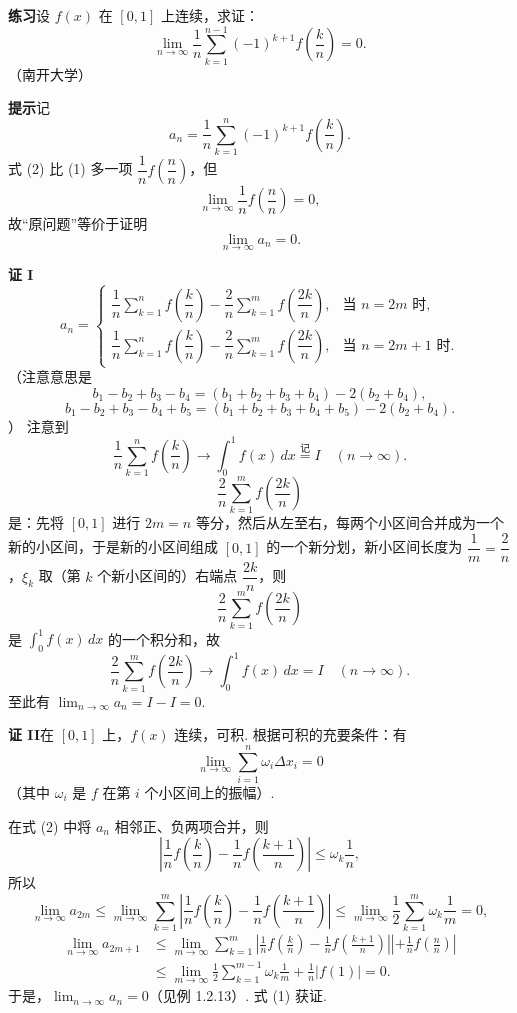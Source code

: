 \documentclass[UTF8, 12pt, fontset=fandol, oneside]{ctexart}
\begin{document}
\noindent\textbf{练习}\quad 设 $f(x)$ 在 $[0,1]$ 上连续，求证：
\[
\lim_{n\to\infty}\frac1n\sum_{k=1}^{n-1}(-1)^{k+1}f\left(\frac kn\right)=0.
\tag{1}
\]
（南开大学）

\noindent\textbf{提示}\quad 记
\[
a_n=\frac1n\sum_{k=1}^n(-1)^{k+1}f\left(\frac kn\right).
\tag{2}
\]
式 (2) 比 (1) 多一项 $\dfrac1n f\left(\dfrac nn\right)$，但
\[
\lim_{n\to\infty}\frac1n f\left(\frac nn\right)=0,
\]
故“原问题”等价于证明
\[
\lim_{n\to\infty}a_n=0.
\]

\noindent\textbf{证 I}\quad
\[
a_n=
\begin{cases}
\dfrac1n\displaystyle\sum_{k=1}^n f\left(\dfrac kn\right)
-\dfrac2n\displaystyle\sum_{k=1}^m f\left(\dfrac{2k}{n}\right),
&\text{当 }n=2m\text{ 时},\\[1.2em]
\dfrac1n\displaystyle\sum_{k=1}^n f\left(\dfrac kn\right)
-\dfrac2n\displaystyle\sum_{k=1}^m f\left(\dfrac{2k}{n}\right),
&\text{当 }n=2m+1\text{ 时}.
\end{cases}
\]
（注意意思是
\[
b_1-b_2+b_3-b_4=(b_1+b_2+b_3+b_4)-2(b_2+b_4),
\]
\[
b_1-b_2+b_3-b_4+b_5=(b_1+b_2+b_3+b_4+b_5)-2(b_2+b_4).
\]
）
注意到
\[
\frac1n\sum_{k=1}^n f\left(\frac kn\right)\to\int_0^1f(x)\,dx\stackrel{\text{记}}{=}I
\quad(n\to\infty).
\]
\[
\frac2n\sum_{k=1}^m f\left(\frac{2k}{n}\right)
\]
是：先将 $[0,1]$ 进行 $2m=n$ 等分，然后从左至右，每两个小区间合并成为一个新的小区间，于是新的小区间组成 $[0,1]$ 的一个新分划，新小区间长度为 $\dfrac1m=\dfrac2n$，$\xi_k$ 取（第 $k$ 个新小区间的）右端点 $\dfrac{2k}{n}$，则
\[
\frac2n\sum_{k=1}^m f\left(\frac{2k}{n}\right)
\]
是 $\displaystyle\int_0^1f(x)\,dx$ 的一个积分和，故
\[
\frac2n\sum_{k=1}^m f\left(\frac{2k}{n}\right)\to\int_0^1f(x)\,dx=I
\quad(n\to\infty).
\]
至此有 $\displaystyle\lim_{n\to\infty}a_n=I-I=0$.

\noindent\textbf{证 II}\quad 在 $[0,1]$ 上，$f(x)$ 连续，可积. 根据可积的充要条件：有
\[
\lim_{n\to\infty}\sum_{i=1}^n\omega_i\Delta x_i=0
\]
（其中 $\omega_i$ 是 $f$ 在第 $i$ 个小区间上的振幅）.

在式 (2) 中将 $a_n$ 相邻正、负两项合并，则
\[
\left|\frac1n f\left(\frac kn\right)-\frac1n f\left(\frac{k+1}{n}\right)\right|
\le\omega_k\frac1n,
\]
所以
\[
\lim_{n\to\infty}a_{2m}
\le \lim_{m\to\infty}\sum_{k=1}^m
\left|\frac1n f\left(\frac kn\right)-\frac1n f\left(\frac{k+1}{n}\right)\right|
\le \lim_{m\to\infty}\frac12\sum_{k=1}^m\omega_k\frac1m=0,
\]
\[
\begin{aligned}
\lim_{n\to\infty}a_{2m+1}
&\le \lim_{m\to\infty}\sum_{k=1}^m
\left|\frac1n f\left(\frac kn\right)-\frac1n f\left(\frac{k+1}{n}\right)\right|
\left|+\frac1n f\left(\frac nn\right)\right|\\
&\le \lim_{m\to\infty}\frac12\sum_{k=1}^{m-1}\omega_k\frac1m
+\frac1n|f(1)|=0.
\end{aligned}
\]
于是，$\displaystyle\lim_{n\to\infty}a_n=0$（见例 1.2.13）. 式 (1) 获证.
\end{document}
